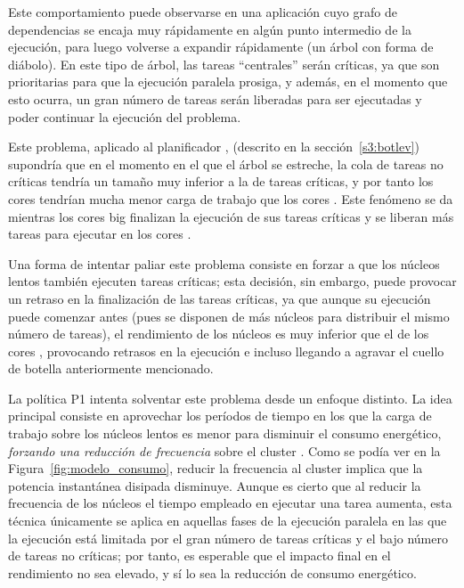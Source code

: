 Este comportamiento puede observarse en una aplicación cuyo grafo de
dependencias se encaja muy rápidamente en algún punto intermedio de la
ejecución, para luego volverse a expandir rápidamente (un árbol con forma
de diábolo). En este tipo de árbol, las tareas ``centrales'' serán
críticas, ya que son prioritarias para que la ejecución paralela prosiga, y
además, en el momento que esto ocurra, un gran número de tareas serán
liberadas para ser ejecutadas y poder continuar la ejecución del problema.

Este problema, aplicado al planificador \botlev, (descrito en la
sección~\ref{s3:botlev}) supondría que en el momento en el que el árbol se
estreche, la cola de tareas no críticas tendría un tamaño muy inferior a la
de tareas críticas, y por tanto los cores \LITTLE tendrían mucha menor carga
de trabajo que los cores \BIG. Este fenómeno se da mientras los cores big
finalizan la ejecución de sus tareas críticas y se liberan más tareas para
ejecutar en los cores \LITTLE.

Una forma de intentar paliar este problema consiste en forzar a que los
núcleos lentos también ejecuten tareas críticas; esta decisión, sin
embargo, puede provocar un retraso en la finalización de las tareas
críticas, ya que aunque su ejecución puede comenzar antes (pues se disponen
de más núcleos para distribuir el mismo número de tareas), el rendimiento
de los núcleos \LITTLE es muy inferior que el de los cores \BIG, provocando
retrasos en la ejecución e incluso llegando a agravar el cuello de botella
anteriormente mencionado.

La política P1 intenta solventar este problema desde un enfoque
distinto. La idea principal consiste en aprovechar los períodos de tiempo
en los que la carga de trabajo sobre los núcleos lentos es menor para
disminuir el consumo energético, {\em forzando una reducción de frecuencia}
sobre el cluster \LITTLE.  Como se podía ver en la
Figura~\ref{fig:modelo_consumo}, reducir la frecuencia al cluster \LITTLE
implica que la potencia instantánea disipada disminuye. Aunque es cierto
que al reducir la frecuencia de los núcleos el tiempo empleado en ejecutar
una tarea aumenta, esta técnica únicamente se aplica en aquellas fases de
la ejecución paralela en las que la ejecución está limitada por el gran
número de tareas críticas y el bajo número de tareas no críticas; por
tanto, es esperable que el impacto final en el rendimiento no sea elevado,
y sí lo sea la reducción de consumo energético.

